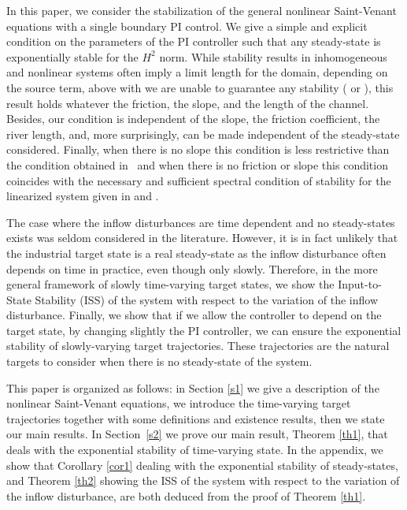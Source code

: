 \documentclass[JEP,XML,SOM,Unicode]{cedram}
\theoremstyle{definition}
\begin{document}
In this paper, we consider the stabilization of the general nonlinear Saint-Venant equations with a single boundary PI control.
We give a simple and explicit condition on the parameters of the PI controller such that any steady-state
is exponentially stable for the $H^{2}$ norm.
While stability results in inhomogeneous and nonlinear systems often imply a limit length for the domain, depending on the source term, above with we are unable to guarantee any stability (\cite{C1,C1_22,BastinCoron22,dos2008} or \cite[Chap.\,6]{BastinCoron1D}),
this result holds whatever the friction, the slope, and the length of the channel.
Besides, our condition is independent of the slope, the friction coefficient, the river length, and, more surprisingly, {can be made independent of }the steady-state considered.
Finally, when there is no slope this condition is less restrictive than the condition obtained in~\cite{BastinCoronPI}
and when there is no friction or slope this condition coincides with the {necessary and sufficient} spectral condition of stability for the linearized system given in \cite{BastinCoronTamasoiu2015} and \cite[Th.\,2.7]{BastinCoron1D}.\enlargethispage{.5\baselineskip}

The case where the inflow disturbances are time dependent and no steady-states exists was seldom considered in the literature.
However, it is in fact unlikely that the industrial target state is a real steady-state as the inflow disturbance often depends on time in practice,
even though only slowly.
Therefore,
in the more general framework of slowly time-varying target states,
we show the Input-to-State Stability (ISS) of the system with respect to the variation of the inflow disturbance.
Finally, we show that if
we allow the controller to depend on the target state,
by changing slightly the PI controller,
we can ensure
the exponential stability of slowly-varying target trajectories. {These trajectories} are the natural {targets} to consider when there is no steady-state of the system.

This paper is organized as follows: in Section \ref{s1} we give a description of the nonlinear Saint-Venant equations, we introduce the time-varying target trajectories together with some definitions and existence results, then we state our main results.
In Section~\ref{s2} we prove our main result, Theorem \ref{th1}, that deals with the exponential stability of time-varying state.
In the appendix, we show that Corollary \ref{cor1} dealing with the exponential stability of steady-states,
and Theorem \ref{th2} showing the ISS of the system with respect to the variation of the inflow disturbance,
are both deduced from the proof of Theorem \ref{th1}.
\end{document}

